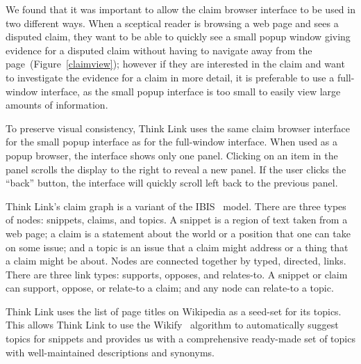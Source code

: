 \documentclass{chi2009}
\newcommand{\todo}[1]{}
\begin{document}

We found that it was important to allow the claim browser interface to be used in two different ways. When a sceptical reader is browsing a web page and sees a disputed claim, they want to be able to quickly see a small popup window giving evidence for a disputed claim without having to navigate away from the page~(Figure~\ref{claimview}); however if they are interested in the claim and want to investigate the evidence for a claim in more detail, it is preferable to use a full-window interface, as the small popup interface is too small to easily view large amounts of information.

To preserve visual consistency, Think Link uses the same claim browser interface for the small popup interface as for the full-window interface. When used as a popup browser, the interface shows only one panel. Clicking on an item in the panel scrolls the display to the right to reveal a new panel. If the user clicks the ``back'' button, the interface will quickly scroll left back to the previous panel.


Think Link's claim graph is a variant of the IBIS~\cite{Rittel1973} model. There are three types of nodes: snippets, claims, and topics. 
A snippet is a region of text taken from a web page; a claim is a statement about the world or a position that one can take on some issue; and a topic is an issue that a claim might address or a thing that a claim might be about. Nodes are connected together by typed, directed, links. 
There are three link types: supports, opposes, and relates-to. A snippet or claim can support, oppose, or relate-to a claim; and any node can relate-to a topic. 

Think Link uses the list of page titles on Wikipedia as a seed-set for its topics. This allows Think Link to use the Wikify~\cite{Mihalcea2007} algorithm to automatically suggest topics for snippets and provides us with a comprehensive ready-made set of topics with well-maintained descriptions and synonyms.
\end{document}
